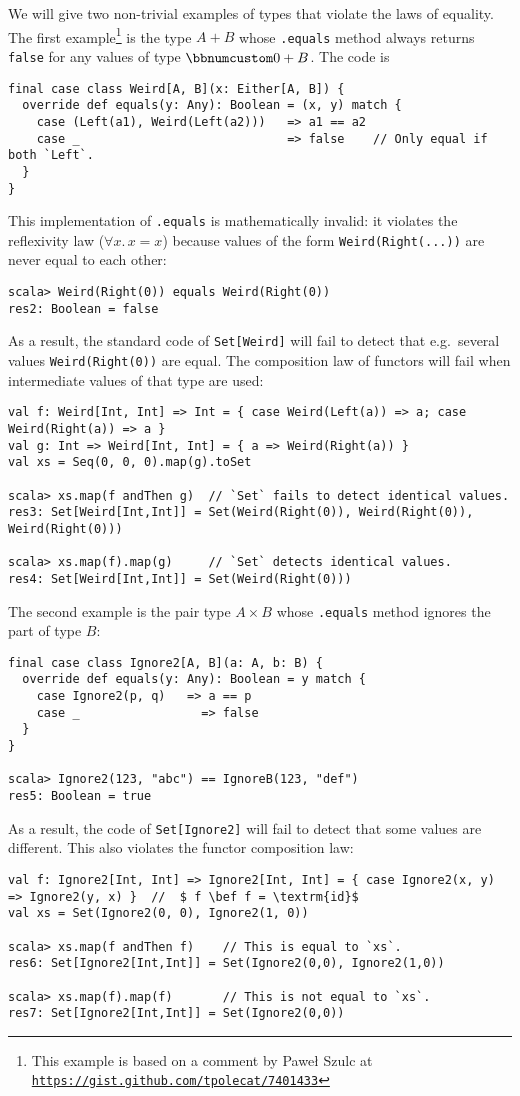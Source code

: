 We will give two non-trivial examples of types that violate the laws
of equality. The first example\footnote{This example is based on a comment by Pawe\l{}
Szulc at \texttt{\href{https://gist.github.com/tpolecat/7401433}{https://gist.github.com/tpolecat/7401433}}} is the type $A+B$ whose \lstinline!.equals! method always returns
\lstinline!false! for any values of type $\bbnum 0+B$. The code
is
\begin{lstlisting}
final case class Weird[A, B](x: Either[A, B]) {
  override def equals(y: Any): Boolean = (x, y) match {
    case (Left(a1), Weird(Left(a2)))   => a1 == a2
    case _                             => false    // Only equal if both `Left`.
  }
}
\end{lstlisting}
This implementation of \lstinline!.equals! is mathematically invalid:
it violates the reflexivity law ($\forall x.\,x=x$) because values
of the form \lstinline!Weird(Right(...))! are never equal to each
other:
\begin{lstlisting}
scala> Weird(Right(0)) equals Weird(Right(0))
res2: Boolean = false
\end{lstlisting}
As a result, the standard code of \lstinline!Set[Weird]! will fail
to detect that e.g.~several values \lstinline!Weird(Right(0))! are
equal. The composition law of functors will fail when intermediate
values of that type are used:
\begin{lstlisting}
val f: Weird[Int, Int] => Int = { case Weird(Left(a)) => a; case Weird(Right(a)) => a }
val g: Int => Weird[Int, Int] = { a => Weird(Right(a)) }
val xs = Seq(0, 0, 0).map(g).toSet

scala> xs.map(f andThen g)  // `Set` fails to detect identical values.
res3: Set[Weird[Int,Int]] = Set(Weird(Right(0)), Weird(Right(0)), Weird(Right(0)))

scala> xs.map(f).map(g)     // `Set` detects identical values.
res4: Set[Weird[Int,Int]] = Set(Weird(Right(0)))
\end{lstlisting}

The second example is the pair type $A\times B$ whose \lstinline!.equals!
method ignores the part of type $B$:
\begin{lstlisting}
final case class Ignore2[A, B](a: A, b: B) {
  override def equals(y: Any): Boolean = y match {
    case Ignore2(p, q)   => a == p
    case _                 => false
  }
}

scala> Ignore2(123, "abc") == IgnoreB(123, "def")
res5: Boolean = true
\end{lstlisting}
As a result, the code of \lstinline!Set[Ignore2]! will fail to detect
that some values are different. This also violates the functor composition
law:
\begin{lstlisting}[mathescape=true]
val f: Ignore2[Int, Int] => Ignore2[Int, Int] = { case Ignore2(x, y) => Ignore2(y, x) }  //  $ f \bef f = \textrm{id}$
val xs = Set(Ignore2(0, 0), Ignore2(1, 0))

scala> xs.map(f andThen f)    // This is equal to `xs`.
res6: Set[Ignore2[Int,Int]] = Set(Ignore2(0,0), Ignore2(1,0))

scala> xs.map(f).map(f)       // This is not equal to `xs`.
res7: Set[Ignore2[Int,Int]] = Set(Ignore2(0,0))
\end{lstlisting}

